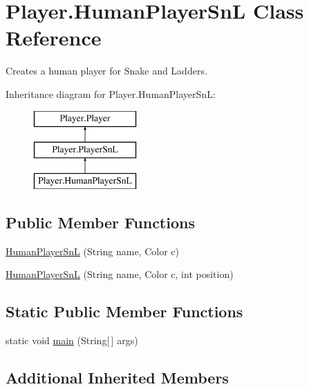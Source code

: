 \hypertarget{class_player_1_1_human_player_sn_l}{}\section{Player.\+Human\+Player\+Sn\+L Class Reference}
\label{class_player_1_1_human_player_sn_l}


Creates a human player for Snake and Ladders.  


Inheritance diagram for Player.\+Human\+Player\+Sn\+L\+:\begin{figure}[H]
\begin{center}
\leavevmode
\includegraphics[height=3.000000cm]{class_player_1_1_human_player_sn_l}
\end{center}
\end{figure}
\subsection*{Public Member Functions}
\begin{DoxyCompactItemize}
\item 
\hyperlink{class_player_1_1_human_player_sn_l_a7605b134f337342fedb834ec55a03b7a}{Human\+Player\+Sn\+L} (String name, Color c)
\item 
\hyperlink{class_player_1_1_human_player_sn_l_ab22f9ceaee8c00bd22b6372d54452391}{Human\+Player\+Sn\+L} (String name, Color c, int position)
\end{DoxyCompactItemize}
\subsection*{Static Public Member Functions}
\begin{DoxyCompactItemize}
\item 
static void \hyperlink{class_player_1_1_human_player_sn_l_a74ccdaec9a1d4188bd8c6c79b2c7f712}{main} (String\mbox{[}$\,$\mbox{]} args)
\end{DoxyCompactItemize}
\subsection*{Additional Inherited Members}


